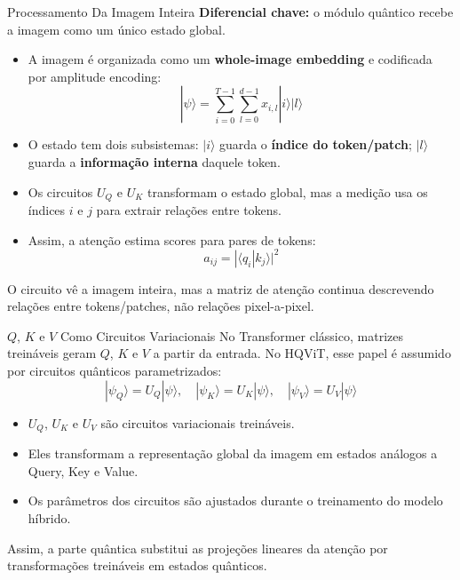 \begin{frame}{Processamento Da Imagem Inteira}
    \textbf{Diferencial chave:} o módulo quântico recebe a imagem como um único estado global.
    \begin{itemize}
        \item A imagem é organizada como um \textbf{whole-image embedding} e codificada por amplitude encoding:
        \[
            |\psi\rangle = \sum_{i=0}^{T-1}\sum_{l=0}^{d-1} x_{i,l}|i\rangle|l\rangle
        \]
        \item O estado tem dois subsistemas: $|i\rangle$ guarda o \textbf{índice do token/patch}; $|l\rangle$ guarda a \textbf{informação interna} daquele token.
        \item Os circuitos $U_Q$ e $U_K$ transformam o estado global, mas a medição usa os índices $i$ e $j$ para extrair relações entre tokens.
        \item Assim, a atenção estima scores para pares de tokens:
        \[
            a_{ij} = |\langle q_i | k_j \rangle|^2
        \]
    \end{itemize}
    \vspace{0.3em}
    O circuito vê a imagem inteira, mas a matriz de atenção continua descrevendo relações entre tokens/patches, não relações pixel-a-pixel.
\end{frame}

\begin{frame}{$Q$, $K$ e $V$ Como Circuitos Variacionais}
    No Transformer clássico, matrizes treináveis geram $Q$, $K$ e $V$ a partir da entrada.
    No HQViT, esse papel é assumido por circuitos quânticos parametrizados:
    \[
        |\psi_Q\rangle = U_Q|\psi\rangle,
        \quad
        |\psi_K\rangle = U_K|\psi\rangle,
        \quad
        |\psi_V\rangle = U_V|\psi\rangle
    \]
    \begin{itemize}
        \item $U_Q$, $U_K$ e $U_V$ são circuitos variacionais treináveis.
        \item Eles transformam a representação global da imagem em estados análogos a Query, Key e Value.
        \item Os parâmetros dos circuitos são ajustados durante o treinamento do modelo híbrido.
    \end{itemize}
    \vspace{0.3em}
    Assim, a parte quântica substitui as projeções lineares da atenção por transformações treináveis em estados quânticos.
\end{frame}

